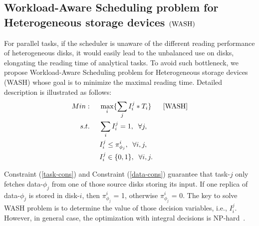 \documentclass[conference]{IEEEtran}
\begin{document}
\subsection{Workload-Aware Scheduling problem for Heterogeneous storage devices $(\rm{WASH})$} \label{WASH}
For parallel tasks, if the scheduler is unaware of the different reading performance of heterogeneous disks, it would easily lead to the unbalanced use on disks, elongating the reading time of analytical tasks. To avoid such bottleneck, we propose Workload-Aware Scheduling problem for Heterogeneous storage devices (WASH) whose goal is to minimize the maximal reading time. Detailed description is illustrated as follows:
\begin{align}
Min:&\;\;\;\;\;\max\limits_{i}\{\sum_{j}I_i^j*T_i\}\;\;\;\;\;\;[\rm{WASH}]\nonumber\\
s.t. 
&\;\;\;\;\;\sum_{i}I_i^j = 1,\;\;\forall j,\label{task-cons}\\
&\;\;\;\;\;I_i^j \leq \pi_{\phi_j}^{i},\;\;\forall i,j\label{data-cons},\\
&\;\;\;\;\;I_i^j\in\{0,1\},\;\;\forall i,j.\label{def-cons}
\end{align}

Constraint (\ref{task-cons}) and Constraint (\ref{data-cons}) guarantee that task-$j$ only fetches data-$\phi_j$ from one of those source disks storing its input. 
If one replica of data-$\phi_j$ is stored in disk-$i$, then $\pi_{\phi_j}^{i}$ = 1, otherwise $\pi_{\phi_j}^{i}$ = 0. 
The key to solve WASH problem is to determine the value of those decision variables, i.e., $I_i^j$. However, in general case, the optimization with integral decisions is NP-hard~\cite{b9}.
\end{document}
